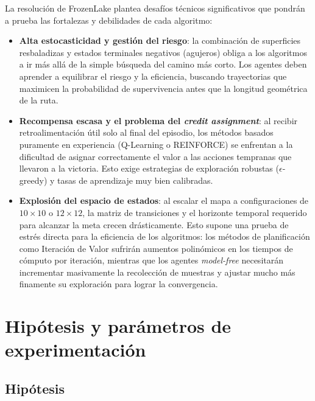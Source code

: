 \documentclass[11pt,a4paper]{article}
\begin{document}
La resolución de FrozenLake plantea desafíos técnicos significativos que pondrán a prueba las fortalezas y debilidades de cada algoritmo:
\begin{itemize}
  \item \textbf{Alta estocasticidad y gestión del riesgo}: la combinación de superficies resbaladizas y estados terminales negativos (agujeros) obliga a los algoritmos a ir más allá de la simple búsqueda del camino más corto. Los agentes deben aprender a equilibrar el riesgo y la eficiencia, buscando trayectorias que maximicen la probabilidad de supervivencia antes que la longitud geométrica de la ruta.
  \item \textbf{Recompensa escasa y el problema del \emph{credit assignment}}: al recibir retroalimentación útil solo al final del episodio, los métodos basados puramente en experiencia (Q-Learning o REINFORCE) se enfrentan a la dificultad de asignar correctamente el valor a las acciones tempranas que llevaron a la victoria. Esto exige estrategias de exploración robustas ($\epsilon$-greedy) y tasas de aprendizaje muy bien calibradas.
  \item \textbf{Explosión del espacio de estados}: al escalar el mapa a configuraciones de $10\times 10$ o $12\times 12$, la matriz de transiciones y el horizonte temporal requerido para alcanzar la meta crecen drásticamente. Esto supone una prueba de estrés directa para la eficiencia de los algoritmos: los métodos de planificación como Iteración de Valor sufrirán aumentos polinómicos en los tiempos de cómputo por iteración, mientras que los agentes \emph{model-free} necesitarán incrementar masivamente la recolección de muestras y ajustar mucho más finamente su exploración para lograr la convergencia.
\end{itemize}

\section{Hipótesis y parámetros de experimentación}

\subsection{Hipótesis}
\end{document}

